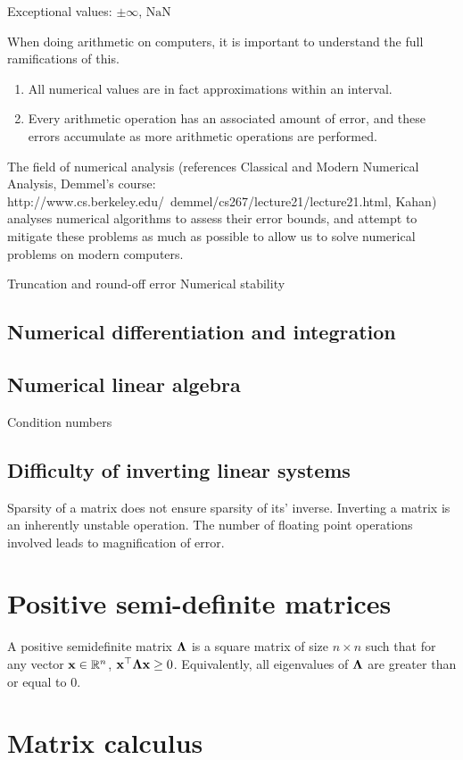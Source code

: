 \documentclass{article}[12pt]
\begin{document}
Exceptional values: $\pm \infty$, $\text{NaN}$

When doing arithmetic on computers, it is important to understand the full ramifications of this.

\begin{enumerate}
\item All numerical values are in fact approximations within an interval.
\item Every arithmetic operation has an associated amount of error, and these errors accumulate as more
			arithmetic operations are performed.
\end{enumerate}

The field of numerical analysis (references Classical and Modern Numerical Analysis,
Demmel's course: http://www.cs.berkeley.edu/~demmel/cs267/lecture21/lecture21.html, Kahan) analyses numerical 
algorithms to assess their error bounds, and attempt to mitigate these problems as much as possible to allow
us to solve numerical problems on modern computers.

Truncation and round-off error
Numerical stability

\subsection{Numerical differentiation and integration}
\subsection{Numerical linear algebra}
Condition numbers
\subsection{Difficulty of inverting linear systems}

Sparsity of a matrix does not ensure sparsity of its' inverse.
Inverting a matrix is an inherently unstable operation. The number of floating point operations involved
leads to magnification of error.

\section{Positive semi-definite matrices}
A positive semidefinite matrix ${\boldsymbol \Lambda}$ is a square matrix of size $n \times n$ such that for any vector
${\bf x} \in {\mathbb{R}}^n$, ${\bf x}^\top {\boldsymbol\Lambda} {\bf x} \geq 0$. Equivalently, all eigenvalues of ${\boldsymbol \Lambda}$ are greater than or 
equal to 0.

\section{Matrix calculus}
\end{document}

